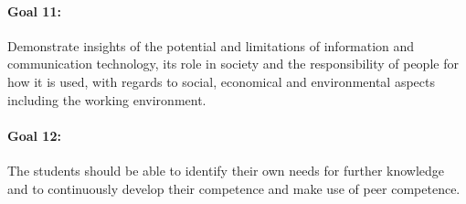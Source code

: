 % 
% 

\paragraph{Goal 11:} Demonstrate insights of the potential and
limitations of information and communication technology, its role in
society and the responsibility of people for how it is used, with
regards to social, economical and environmental aspects including the
working environment.

% 
% 
% 
\paragraph{Goal 12:} The students should be able to identify their own
needs for further knowledge and to continuously develop their
competence and make use of peer competence.

% 
% 
% 


